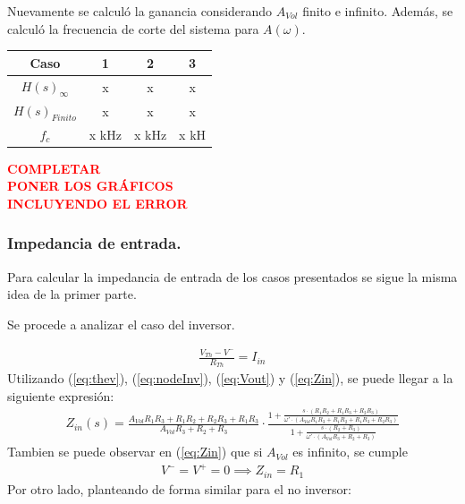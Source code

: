 Nuevamente se calculó la ganancia considerando $A_{Vol}$ finito e infinito. Además, se calculó la frecuencia de corte del sistema para $A(\omega)$.

\begin{table}[H]
\begin{center}
\begin{tabular}{|c|c|c|c|}
\hline
\textbf{Caso}            & \textbf{1} & \textbf{2} & \textbf{3} \\ \hline
\textbf{$H(s)_{\infty}$} & x         & x          & x        \\ \hline
\textbf{$H(s)_{Finito}$} & x     & x     & x     \\ \hline
\textbf{$f_c$}           & x kHz   & x kHz  & x kH     \\ \hline
\end{tabular}
\end{center}
\end{table}

\begin{center}
\textcolor{red}{\textbf{COMPLETAR}}\\
\textcolor{red}{\textbf{PONER LOS GRÁFICOS}}\\
\textcolor{red}{\textbf{INCLUYENDO EL ERROR}}
\end{center}

\subsubsection{Impedancia de entrada.}

Para calcular la impedancia de entrada de los casos presentados se sigue la misma idea de la primer parte.

Se procede a analizar el caso del inversor.

\begin{align}
\label{eq:Zin}
\frac{V_{Th} - V^-}{R_{Th}}=I_{in}
\end{align}
Utilizando (\ref{eq:thev}), (\ref{eq:nodeInv}), (\ref{eq:Vout}) y (\ref{eq:Zin}), se puede llegar a la siguiente expresión:
\begin{align}
	Z_{in}(s)=\frac{A_{Vol}R_1R_3+R_1R_2+R_2R_3+R_1R_3}{A_{Vol}R_3+R_2+R_3}\cdot \frac{1+\frac{s\cdot (R_1R_2+R_1R_3+R_2R_3)}{\omega ' \cdot (A_{Vol}R_1R_3+R_1R_2+R_1R_3+R_2R_3)}}{1+\frac{s\cdot (R_2+R_3)}{\omega ' \cdot(A_{Vol}R_3+R_2+R_3)}}
\end{align}
Tambien se puede observar en (\ref{eq:Zin}) que si $A_{Vol}$ es infinito, se cumple
\begin{align} V^- = V^+=0 \implies Z_{in}=R_1
\end{align}
Por otro lado, planteando de forma similar para el no inversor:

